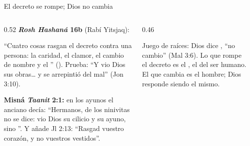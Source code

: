 \begin{frame}{El decreto se rompe; Dios no cambia}
\begin{columns}[t,onlytextwidth]
\begin{column}{0.52\textwidth}\scriptsize
\textbf{\emph{Rosh Hashaná} 16b} (Rabí Yitsjaq):\par\begin{center}\end{center}``Cuatro cosas rasgan el decreto contra una persona: la caridad, el clamor, el cambio de nombre y el '' (). Prueba: ``Y vio Dios sus obras\ldots{} y se arrepintió del mal'' (Jon 3:10).\par\smallskip
\textbf{Misná \emph{Taanit} 2:1:} en los ayunos el anciano decía: ``Hermanos, de los ninivitas no se dice: vio Dios su cilicio y su ayuno, sino ''. Y añade Jl 2:13: ``Rasgad vuestro corazón, y no vuestros vestidos''.
\end{column}
\begin{column}{0.46\textwidth}
\begin{tcolorbox}[colback=papiro,colframe=dorado,boxrule=1.2pt,arc=3pt]
\small Juego de raíces: Dios dice , ``no cambio'' (Mal 3:6). Lo que rompe el decreto es el , el  del ser humano. El que cambia es el hombre; Dios responde siendo el mismo.
\end{tcolorbox}
\end{column}
\end{columns}
\end{frame}

